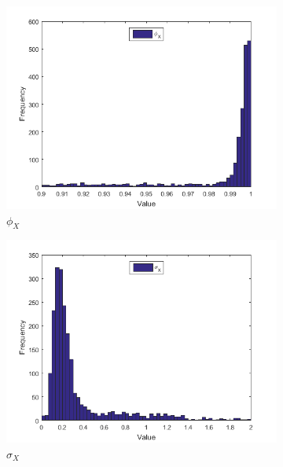 \documentclass[11pt,a4,twosided,singlespacing,titlepagenumber=on]{scrreprt}
\numberwithin{equation}{chapter} %
\theoremstyle{remark}
\begin{document}
\begin{figure}[H]
    \centering
    \begin{subfigure}[t]{0.32\textwidth}
        \centering
        \includegraphics[width=1\textwidth]{res/params/731_1462/1}
        \caption{$\phi_X$}
    \end{subfigure}
    \begin{subfigure}[t]{0.32\textwidth}
        \centering
        \includegraphics[width=1\textwidth]{res/params/731_1462/2}
        \caption{$\sigma_X$}
    \end{subfigure}
    \begin{subfigure}[t]{0.32\textwidth}
        \centering

\end{subfigure}
\end{figure}
\end{document}
